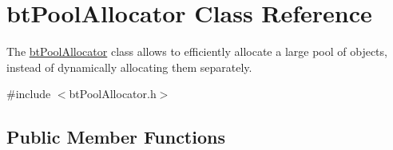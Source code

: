 \hypertarget{classbtPoolAllocator}{}\section{bt\+Pool\+Allocator Class Reference}
\label{classbtPoolAllocator}


The \hyperlink{classbtPoolAllocator}{bt\+Pool\+Allocator} class allows to efficiently allocate a large pool of objects, instead of dynamically allocating them separately.  




{\ttfamily \#include $<$bt\+Pool\+Allocator.\+h$>$}

\subsection*{Public Member Functions}

